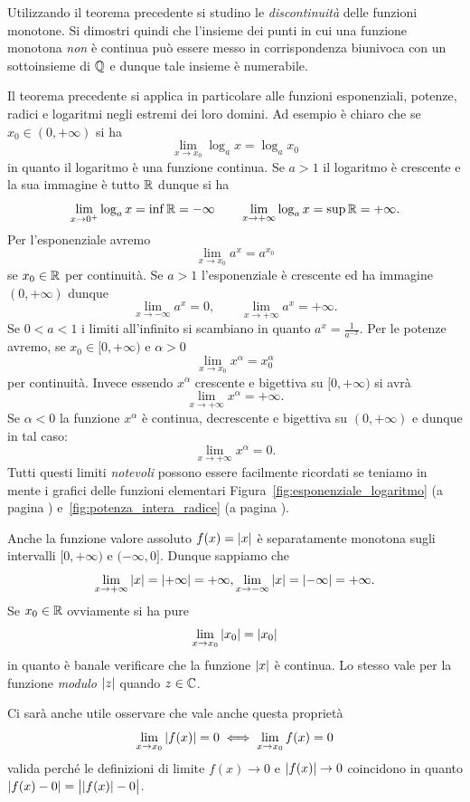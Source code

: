 \begin{exercise}
  Utilizzando il teorema precedente si studino le \emph{discontinuità}
  delle funzioni monotone. 
  Si dimostri quindi che l'insieme dei punti in cui una funzione monotona 
  \emph{non} è continua può essere messo in corrispondenza biunivoca 
  con un sottoinsieme di ${\mathbb Q}$ e dunque tale insieme è numerabile.
\end{exercise}

Il teorema precedente si applica in particolare alle funzioni 
esponenziali, potenze, radici e logaritmi negli estremi dei loro 
domini. Ad esempio è chiaro che se $x_0\in (0,+\infty)$ 
si ha 
\[
  \lim_{x\to x_0} \log_a x = \log_a x_0
\]
in quanto il logaritmo è una funzione continua. 
Se $a>1$ il logaritmo è crescente e la sua immagine è tutto ${\mathbb R}$ 
dunque si ha 
\[
  \lim_{x\to 0^+} \log_a x = \inf {\mathbb R} = -\infty
  \qquad
  \lim_{x\to +\infty} \log_a x = \sup {\mathbb R} = +\infty.
\]
Per l'esponenziale avremo 
\[
 \lim_{x\to x_0} a^x = a^{x_0}
\]
se $x_0\in {\mathbb R}$ per continuità. 
Se $a>1$ l'esponenziale è crescente 
ed ha immagine $(0,+\infty)$ dunque 
\[
  \lim_{x\to -\infty} a^x = 0, \qquad 
  \lim_{x\to +\infty} a^x = +\infty.
\]
Se $0<a<1$ i limiti all'infinito 
si scambiano in quanto $a^{x}= \frac{1}{a^{-x}}$.
Per le potenze avremo, se $x_0\in[0,+\infty)$ e $\alpha>0$
\[
  \lim_{x\to x_0} x^\alpha = x_0^\alpha
\]
per continuità. Invece essendo $x^\alpha$ crescente e bigettiva 
su $[0,+\infty)$ si avrà 
\[
  \lim_{x\to +\infty} x^\alpha = +\infty.
\]
Se $\alpha<0$ la funzione $x^\alpha$ è continua, decrescente e bigettiva 
su $(0,+\infty)$ e dunque in tal caso:
\[
  \lim_{x\to +\infty} x^\alpha = 0.
\]
Tutti questi limiti \emph{notevoli} possono essere facilmente 
ricordati se teniamo in mente i grafici delle funzioni elementari
Figura~\ref{fig:esponenziale_logaritmo} (a pagina \pageref{fig:esponenziale_logaritmo})
e~\ref{fig:potenza_intera_radice} (a pagina \pageref{fig:potenza_intera_radice}).

Anche la funzione valore assoluto $f(x)={\left|x\right|}$ è separatamente 
monotona sugli intervalli $[0,+\infty)$ e $(-\infty,0]$. 
Dunque sappiamo che 
\[
  \lim_{x\to +\infty} {\left|x\right|} = {\left|+\infty\right|} = +\infty, 
  \lim_{x\to -\infty} {\left|x\right|} = {\left|-\infty\right|} = +\infty.
\]
Se $x_0\in {\mathbb R}$ ovviamente si ha pure
\[
  \lim_{x\to x_0} {\left|x_0\right|} = {\left|x_0\right|}
\]
in quanto è banale verificare che la funzione ${\left|x\right|}$ è continua.
Lo stesso vale per la funzione \emph{modulo} ${\left|z\right|}$ quando $z\in {\mathbb C}$.

Ci sarà anche utile osservare che vale anche questa proprietà 
\[
\lim_{x\to x_0} {\left|f(x)\right|} = 0 \iff 
\lim_{x\to x_0} f(x) = 0
\]
valida perché le definizioni di limite $f(x)\to 0$ e ${\left|f(x)\right|}\to 0$ 
coincidono in quanto ${\left|f(x)-0\right|} = \big\lvert{{\left|f(x)\right|} - 0}\big\rvert$.

